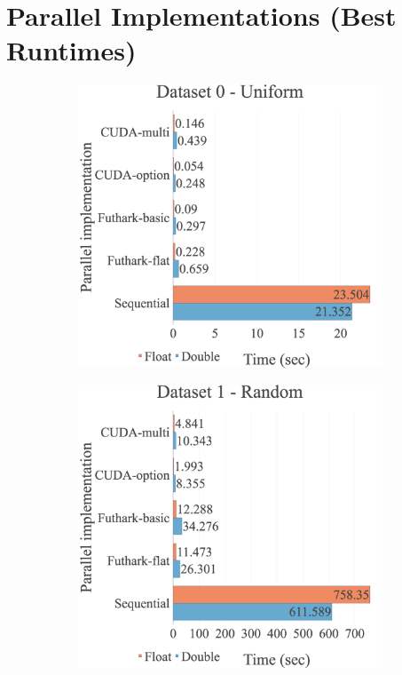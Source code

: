 \label{appendix:experiments:implementations}

\section{Parallel Implementations (Best Runtimes)}
\begin{figure}[H]
\begin{adjustwidth}{-2cm}{-2cm}
\centering
\begin{subfigure}{.62\textwidth}
    \centering
    \includegraphics[width=1\textwidth]{img/experiments/all-approaches-0_UNIFORM.png}
\end{subfigure}
\begin{subfigure}{.62\textwidth}
    \centering
    \includegraphics[width=1\textwidth]{img/experiments/all-approaches-1_RAND.png}

\end{subfigure}
\end{adjustwidth}
\end{figure}
